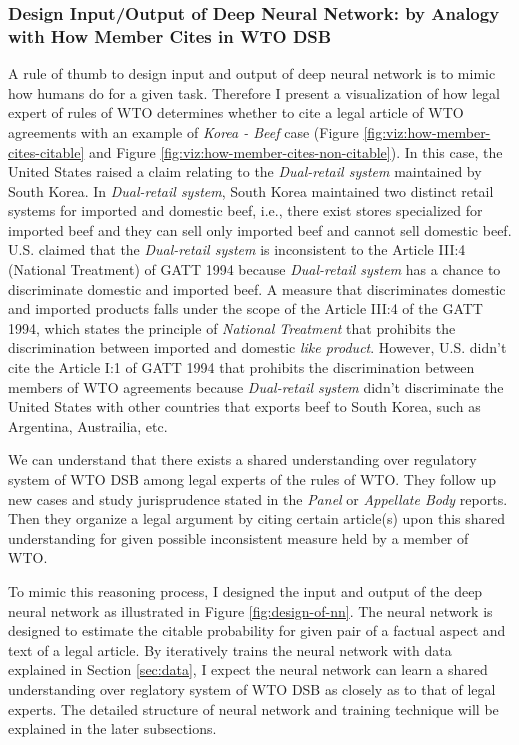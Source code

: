 \documentclass[12pt,letterpaper]{article}
\begin{document}
\subsubsection{Design Input/Output of Deep Neural Network: by Analogy with How Member Cites in WTO DSB}
A rule of thumb to design input and output of deep neural network is to mimic 
how humans do for a given task. 
Therefore I present a visualization of how legal expert of rules of WTO determines whether to cite a legal article of WTO agreements with an example of \textit{Korea - Beef} case (Figure \ref{fig:viz:how-member-cites-citable} and Figure \ref{fig:viz:how-member-cites-non-citable}).
In this case, the United States raised a claim relating to the \textit{Dual-retail system} maintained by South Korea. In \textit{Dual-retail system}, South Korea maintained two distinct retail systems
for imported and domestic beef, i.e., there exist stores specialized for imported beef and they can sell only imported beef and cannot sell domestic beef. U.S. claimed that the \textit{Dual-retail system} is inconsistent to the Article III:4 (National Treatment) of GATT 1994 
because \textit{Dual-retail system} has a chance to discriminate domestic and imported beef. A measure that discriminates domestic and imported products falls under the scope of the Article III:4 of the GATT 1994, which states the principle of \textit{National Treatment} that prohibits the discrimination between imported and domestic \textit{like product}. However, U.S. didn't 
cite the Article I:1 of GATT 1994 that prohibits the discrimination between members of WTO agreements
because \textit{Dual-retail system} didn't discriminate the United States with other countries that exports beef to South Korea, such as Argentina, Austrailia, etc.

We can understand that there exists a shared understanding over regulatory system of WTO DSB among legal experts of the rules of WTO. They follow up new cases and study jurisprudence stated in the \textit{Panel} or  \textit{Appellate Body} reports.
Then they organize a legal argument by citing certain article(s) upon this shared understanding for given possible inconsistent measure held by a member of WTO.

To mimic this reasoning process, I designed the input and output of the deep neural network as illustrated in Figure \ref{fig:design-of-nn}.
The neural network is designed to estimate the citable probability for given pair of a factual aspect and text of a legal article. 
By iteratively trains the neural network with data explained in Section \ref{sec:data}, I expect the neural network can learn a shared understanding over reglatory system of WTO DSB as closely as to that of legal experts.
The detailed structure of neural network and training technique will be explained in the later subsections.
\end{document}
